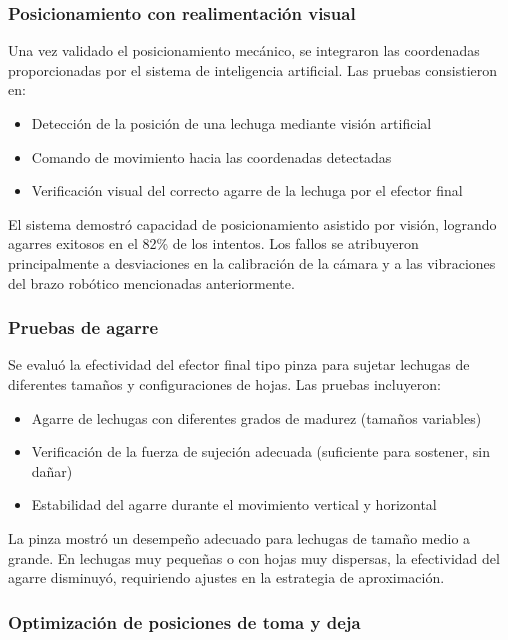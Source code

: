 \subsubsection{Posicionamiento con realimentación visual}

Una vez validado el posicionamiento mecánico, se integraron las coordenadas proporcionadas por el sistema de inteligencia artificial. Las pruebas consistieron en:

\begin{itemize}
    \item Detección de la posición de una lechuga mediante visión artificial
    \item Comando de movimiento hacia las coordenadas detectadas
    \item Verificación visual del correcto agarre de la lechuga por el efector final
\end{itemize}

El sistema demostró capacidad de posicionamiento asistido por visión, logrando agarres exitosos en el 82\% de los intentos. Los fallos se atribuyeron principalmente a desviaciones en la calibración de la cámara y a las vibraciones del brazo robótico mencionadas anteriormente.

\subsubsection{Pruebas de agarre}

Se evaluó la efectividad del efector final tipo pinza para sujetar lechugas de diferentes tamaños y configuraciones de hojas. Las pruebas incluyeron:

\begin{itemize}
    \item Agarre de lechugas con diferentes grados de madurez (tamaños variables)
    \item Verificación de la fuerza de sujeción adecuada (suficiente para sostener, sin dañar)
    \item Estabilidad del agarre durante el movimiento vertical y horizontal
\end{itemize}

La pinza mostró un desempeño adecuado para lechugas de tamaño medio a grande. En lechugas muy pequeñas o con hojas muy dispersas, la efectividad del agarre disminuyó, requiriendo ajustes en la estrategia de aproximación.

\subsubsection{Optimización de posiciones de toma y deja}

